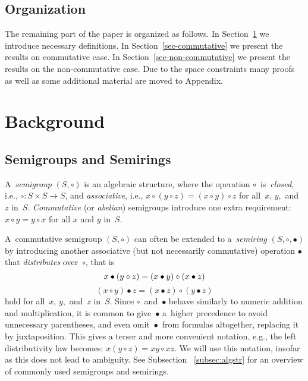 \documentclass[a4paper,UKenglish,cleveref, autoref]{lipics-v2019}
\begin{document}
\subsection{Organization}

The remaining part of the paper is organized as follows. In Section~\ref{sec:background} we introduce necessary definitions. In Section~\ref{sec-commutative} we present the results on commutative case. In Section~\ref{sec-non-commutative} we present the results on the non-commutative case. Due to the space constraints many proofs as well as some additional material are moved to Appendix.

\section{Background} \label{sec:background}
\subsection{Semigroups and Semirings}
A~\emph{semigroup} $(S, \circ)$ is an algebraic structure, where
the operation
$\circ$~is~\emph{closed}, i.e., $\circ : S\times S \rightarrow S$,
and
\emph{associative}, i.e.,
$x \circ (y \circ z) = (x \circ y) \circ z$ for all~$x$, $y$,~and~$z$
in~$S$.
\emph{Commutative} (or \emph{abelian}) semigroups introduce
one extra requirement: $x \circ y = y \circ x$ for all $x$ and $y$
in~$S$.

A~commutative semigroup $(S, \circ)$ can often be extended to
a~\emph{semiring} $(S, \circ, \bullet)$ by introducing
another associative (but not necessarily
commutative)
operation $\bullet$ that \emph{distributes} over~$\circ$, that is
\[
x \bullet (y \circ z) = (x \bullet y) \circ (x \bullet z)\\
\]
\[
(x \circ y) \bullet z = (x \bullet z) \circ (y \bullet z)
\]
hold for all~$x$, $y$,~and~$z$ in~$S$.
Since $\circ$~and~$\bullet$ behave
similarly to numeric addition and multiplication, it is common to
give~$\bullet$ a~higher precedence to avoid
unnecessary parentheses, and even omit~$\bullet$~from
formulas altogether, replacing it by juxtaposition.
This gives a terser and
more convenient notation, e.g., the left distributivity law becomes:
$x (y \circ z) = x y \circ x z$. We will use this notation,
insofar as this does not lead to ambiguity. See Subsection~
\ref{subsec:algstr} for an overview of commonly used
semigroups and semirings.
\end{document}
